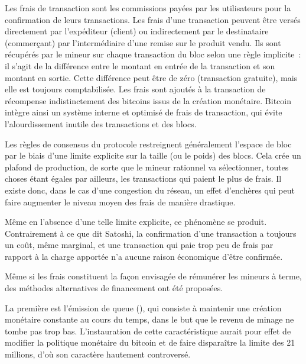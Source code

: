 Les frais de transaction sont les commissions payées par les utilisateurs pour la confirmation de leurs transactions. Les frais d'une transaction peuvent être versés directement par l'expéditeur (client) ou indirectement par le destinataire (commerçant) par l'intermédiaire d'une remise sur le produit vendu. Ils sont récupérés par le mineur sur chaque transaction du bloc selon une règle implicite~: il s'agit de la différence entre le montant en entrée de la transaction et son montant en sortie. Cette différence peut être de zéro (transaction gratuite), mais elle est toujours comptabilisée. Les frais sont ajoutés à la transaction de récompense indistinctement des bitcoins issus de la création monétaire. Bitcoin intègre ainsi un système interne et optimisé de frais de transaction, qui évite l'alourdissement inutile des transactions et des blocs.

Les règles de consensus du protocole restreignent généralement l'espace de bloc par le biais d'une limite explicite sur la taille (ou le poids) des blocs. Cela crée un plafond de production, de sorte que le mineur rationnel va sélectionner, toutes choses étant égales par ailleurs, les transactions qui paient le plus de frais. Il existe donc, dans le cas d'une congestion du réseau, un effet d'enchères qui peut faire augmenter le niveau moyen des frais de manière drastique.

Même en l'absence d'une telle limite explicite, ce phénomène se produit. Contrairement à ce que dit Satoshi, la confirmation d'une transaction a toujours un coût, même marginal, et une transaction qui paie trop peu de frais par rapport à la charge apportée n'a aucune raison économique d'être confirmée.


Même si les frais constituent la façon envisagée de rémunérer les mineurs à terme, des méthodes alternatives de financement ont été proposées. 

La première est l'émission de queue (), qui consiste à maintenir une création monétaire constante au cours du temps, dans le but que le revenu de minage ne tombe pas trop bas. L'instauration de cette caractéristique aurait pour effet de modifier la politique monétaire du bitcoin et de faire disparaître la limite des 21 millions, d'où son caractère hautement controversé.

